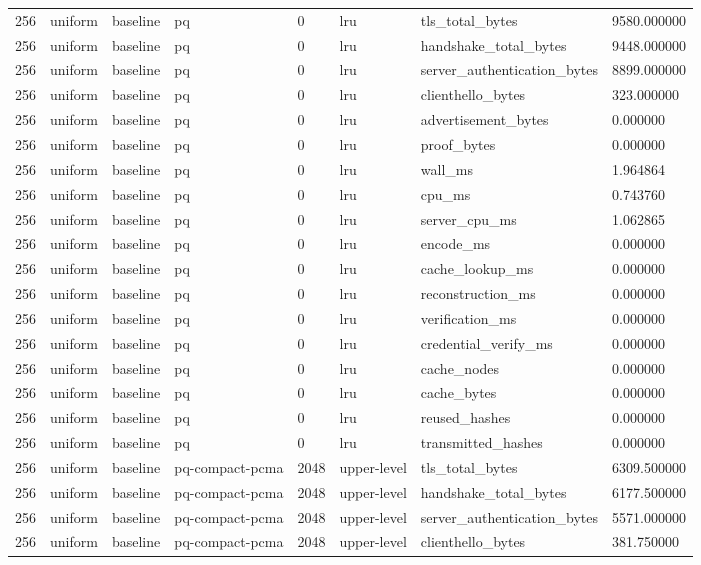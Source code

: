 \begin{tabular}{llllllll}
256 & uniform & baseline & pq & 0 & lru & tls\_total\_bytes & 9580.000000 \\
256 & uniform & baseline & pq & 0 & lru & handshake\_total\_bytes & 9448.000000 \\
256 & uniform & baseline & pq & 0 & lru & server\_authentication\_bytes & 8899.000000 \\
256 & uniform & baseline & pq & 0 & lru & clienthello\_bytes & 323.000000 \\
256 & uniform & baseline & pq & 0 & lru & advertisement\_bytes & 0.000000 \\
256 & uniform & baseline & pq & 0 & lru & proof\_bytes & 0.000000 \\
256 & uniform & baseline & pq & 0 & lru & wall\_ms & 1.964864 \\
256 & uniform & baseline & pq & 0 & lru & cpu\_ms & 0.743760 \\
256 & uniform & baseline & pq & 0 & lru & server\_cpu\_ms & 1.062865 \\
256 & uniform & baseline & pq & 0 & lru & encode\_ms & 0.000000 \\
256 & uniform & baseline & pq & 0 & lru & cache\_lookup\_ms & 0.000000 \\
256 & uniform & baseline & pq & 0 & lru & reconstruction\_ms & 0.000000 \\
256 & uniform & baseline & pq & 0 & lru & verification\_ms & 0.000000 \\
256 & uniform & baseline & pq & 0 & lru & credential\_verify\_ms & 0.000000 \\
256 & uniform & baseline & pq & 0 & lru & cache\_nodes & 0.000000 \\
256 & uniform & baseline & pq & 0 & lru & cache\_bytes & 0.000000 \\
256 & uniform & baseline & pq & 0 & lru & reused\_hashes & 0.000000 \\
256 & uniform & baseline & pq & 0 & lru & transmitted\_hashes & 0.000000 \\
256 & uniform & baseline & pq-compact-pcma & 2048 & upper-level & tls\_total\_bytes & 6309.500000 \\
256 & uniform & baseline & pq-compact-pcma & 2048 & upper-level & handshake\_total\_bytes & 6177.500000 \\
256 & uniform & baseline & pq-compact-pcma & 2048 & upper-level & server\_authentication\_bytes & 5571.000000 \\
256 & uniform & baseline & pq-compact-pcma & 2048 & upper-level & clienthello\_bytes & 381.750000 \\

\end{tabular}
